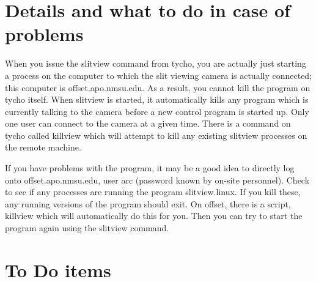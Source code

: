 \documentclass[10pt]{article}
\renewcommand{\[}{\begin{eqnarray}}
\renewcommand{\]}{\end{eqnarray}}
\begin{document}
\section{Details and what to do in case of problems}

When you issue the slitview command from tycho, you are actually just
starting a process on the computer to which the slit viewing camera
is actually connected; this computer is offset.apo.nmsu.edu. As a result,
you cannot kill the program on tycho itself. When slitview is started,
it automatically kills any program which is currently talking to the
camera before a new control program is started up. Only one user can
connect to the camera at a given time. There is a command on tycho called
killview which will attempt to kill any existing slitview processes on the
remote machine.

If you have problems with the program, it may be a good idea to directly
log onto offset.apo.nmsu.edu, user arc (password known by on-site personnel).
Check to see if any processes are running the program slitview.linux. If you
kill these, any running versions of the program should exit. On offset,
there is a script, killview which will automatically do this for you. Then
you can try to start the program again using the slitview command.

\section{To Do items}
\end{document}
